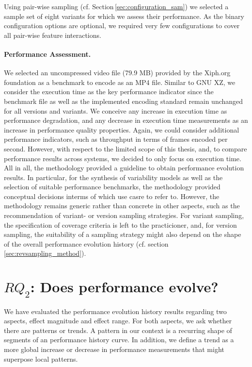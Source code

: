 Using pair-wise sampling (cf. Section\,\ref{sec:configuration_sam}) we selected
a sample set of eight variants for which we assess their performance. As the binary configuration
options are optional, we required very few configurations to cover all
pair-wise feature interactions.

\paragraph{Performance Assessment.} We selected an uncompressed video file (79.9
MB) provided by the Xiph.org foundation as a benchmark to encode as an MP4 file.
Similar to GNU XZ, we consider the execution time as the key performance
indicator since the benchmark file as well as the implemented encoding standard
remain unchanged for all versions and variants. We conceive any increase in
execution time as performance degradation, and any decrease in execution time
measurements as an increase in performance quality properties. Again, we could
consider additional performance indicators, such as throughput in terms of
frames encoded per second. However, with respect to the limited scope of this
thesis, and, to compare performance results across systems, we decided to only
focus on execution time.\\

All in all, the methodology provided a guideline to obtain
performance evolution results. In particular, for the synthesis of variability
models as well as the selection of suitable performance benchmarks, the
methodology provided conceptual decisions interms of which use casre to refer
to. However, the methodology remains generic rather than concrete in other
aspects, such as the recommendation of variant- or version sampling strategies.
For variant sampling, the specification of coverage criteria is left to the
practicioner, and, for version sampling, the suitability of a sampling strategy
might also depend on the shape of the overall performance evolution history
(cf. section\,\ref{sec:revsampling_method}).

\section{$RQ_2$: Does performance evolve?}\label{sec:expresults}
We have evaluated the performance evolution history results regarding two
aspects, effect magnitude and effect range. For both aspects, we ask whether
there are patterns or trends. A pattern in our context is a recurring shape of
segments of an performance history curve. In addition, we define a trend as a
more global increase or decrease in performance measurements that might
superpose local patterns.

